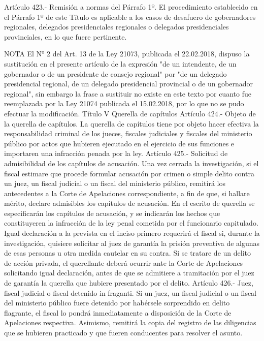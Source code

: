     Artículo 423.- Remisión a normas del Párrafo 1º. El procedimiento establecido en el Párrafo 1º de este Título es aplicable a los casos de desafuero de gobernadores regionales, delegados presidenciales regionales o delegados presidenciales provinciales, en lo que fuere pertinente.




NOTA
      El N° 2 del Art. 13 de la Ley 21073, publicada el 22.02.2018, dispuso la sustitución en el presente artículo de la expresión "de un intendente, de un gobernador o de un presidente de consejo regional" por "de un delegado presidencial regional, de un delegado presidencial provincial o de un gobernador regional", sin embargo la frase a sustituir no existe en este texto por cuanto fue reemplazada por la Ley 21074 publicada el 15.02.2018, por lo que no se pudo efectuar la modificación.
    Título V
    Querella de capítulos
    Artículo 424.- Objeto de la querella de capítulos. La querella de capítulos tiene por objeto hacer efectiva la responsabilidad criminal de los jueces, fiscales judiciales y fiscales del ministerio público por actos que hubieren ejecutado en el ejercicio de sus funciones e importaren una infracción penada por la ley.
    Artículo 425.- Solicitud de admisibilidad de los capítulos de acusación. Una vez cerrada la investigación, si el fiscal estimare que procede formular acusación por crimen o simple delito contra un juez, un fiscal judicial o un fiscal del ministerio público, remitirá los antecedentes a la Corte de Apelaciones correspondiente, a fin de que, si hallare mérito, declare admisibles los capítulos de acusación.
    En el escrito de querella se especificarán los capítulos de acusación, y se indicarán los hechos que constituyeren la infracción de la ley penal cometida por el funcionario capitulado.
    Igual declaración a la prevista en el inciso primero requerirá el fiscal si, durante la investigación, quisiere solicitar al juez de garantía la prisión preventiva de algunas de esas personas u otra medida cautelar en su contra.
    Si se tratare de un delito de acción privada, el querellante deberá ocurrir ante la Corte de Apelaciones solicitando igual declaración, antes de que se admitiere a tramitación por el juez de garantía la querella que hubiere presentado por el delito.
    Artículo 426.- Juez, fiscal judicial o fiscal detenido in fraganti. Si un juez, un fiscal judicial o un fiscal del ministerio público fuere detenido por habérsele sorprendido en delito flagrante, el fiscal lo pondrá inmediatamente a disposición de la Corte de Apelaciones respectiva. Asimismo, remitirá la copia del registro de las diligencias que se hubieren practicado y que fueren conducentes para resolver el asunto.
